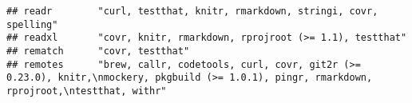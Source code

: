 \documentclass[]{book}
\begin{document}
\begin{verbatim}
## readr        "curl, testthat, knitr, rmarkdown, stringi, covr, spelling"                                                                                                                                                                                                                                                                                                                                                                                                                                                                                                                                                                                                                                               
## readxl       "covr, knitr, rmarkdown, rprojroot (>= 1.1), testthat"                                                                                                                                                                                                                                                                                                                                                                                                                                                                                                                                                                                                                                                    
## rematch      "covr, testthat"                                                                                                                                                                                                                                                                                                                                                                                                                                                                                                                                                                                                                                                                                          
## remotes      "brew, callr, codetools, curl, covr, git2r (>= 0.23.0), knitr,\nmockery, pkgbuild (>= 1.0.1), pingr, rmarkdown, rprojroot,\ntestthat, withr"                                                                                                                                                                                                                                                                                                                                                                                                                                                                                                                                                              

\end{verbatim}
\end{document}
